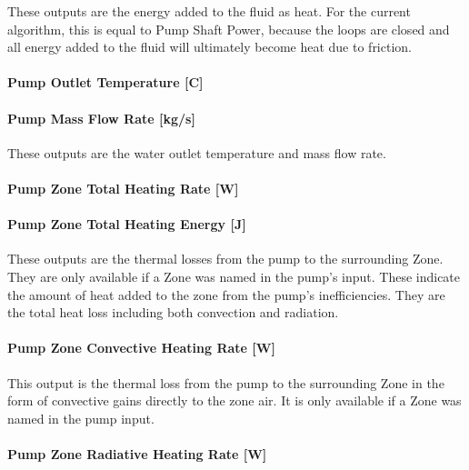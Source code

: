 These outputs are the energy added to the fluid as heat. For the current algorithm, this is equal to Pump Shaft Power, because the loops are closed and all energy added to the fluid will ultimately become heat due to friction.

\paragraph{Pump Outlet Temperature {[}C{]}}\label{pump-outlet-temperature-c}

\paragraph{Pump Mass Flow Rate {[}kg/s{]}}\label{pump-mass-flow-rate-kgs}

These outputs are the water outlet temperature and mass flow rate.

\paragraph{Pump Zone Total Heating Rate {[}W{]}}\label{pump-zone-total-heating-rate-w}

\paragraph{Pump Zone Total Heating Energy {[}J{]}}\label{pump-zone-total-heating-energy-j}

These outputs are the thermal losses from the pump to the surrounding Zone. They are only available if a Zone was named in the pump's input. These indicate the amount of heat added to the zone from the pump's inefficiencies. They are the total heat loss including both convection and radiation.

\paragraph{Pump Zone Convective Heating Rate {[}W{]}}\label{pump-zone-convective-heating-rate-w}

This output is the thermal loss from the pump to the surrounding Zone in the form of convective gains directly to the zone air. It is only available if a Zone was named in the pump input.

\paragraph{Pump Zone Radiative Heating Rate {[}W{]}}\label{pump-zone-radiative-heating-rate-w}

